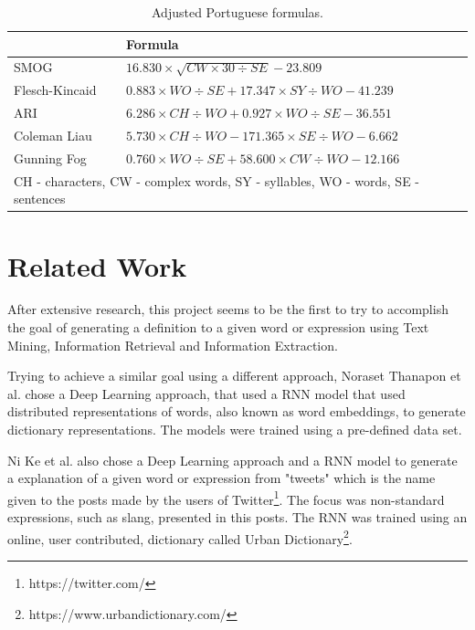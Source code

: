\begin{table}[H]
    \centering
    \caption{Adjusted Portuguese formulas.}
    \label{table:ptformulas}
    \begin{tabular}{l|l}
        \hline
        {} & {\bfseries Formula} \\
        \hline
        SMOG & \(16.830 \times \sqrt{CW \times 30 \div SE} - 23.809\)  \\
        \hline
        Flesch-Kincaid & \(0.883 \times WO \div SE + 17.347 \times SY \div WO - 41.239\) \\
        \hline
        ARI & \(6.286 \times CH \div WO + 0.927 \times WO \div SE - 36.551\) \\
        \hline
        Coleman Liau & \(5.730 \times CH \div WO - 171.365 \times SE \div WO - 6.662\) \\
        \hline
        Gunning Fog & \(0.760 \times WO \div SE + 58.600 \times CW \div WO - 12.166\) \\
        \hline
        \multicolumn{2}{l}{CH - characters, CW - complex words, SY - syllables, WO - words, SE - sentences}
    \end{tabular}
\end{table}

\section{Related Work}

After extensive research, this project seems to be the first to try to accomplish the goal of generating a definition to a given word or expression using Text Mining, Information Retrieval and Information Extraction.

Trying to achieve a similar goal using a different approach, Noraset Thanapon et al.\cite{noraset2016definition} chose a Deep Learning approach, that used a \gls{RNN} model that used distributed representations of words, also known as word embeddings, to generate dictionary representations.
The models were trained using a pre-defined data set.

Ni Ke et al.\cite{ni2017learning} also chose a Deep Learning approach and a \gls{RNN} model to generate a explanation of a given word or expression from "tweets" which is the name given to the posts made by the users of Twitter\footnote{https://twitter.com/}.
The focus was non-standard expressions, such as slang, presented in this posts.
The \gls{RNN} was trained using an online, user contributed, dictionary called Urban Dictionary\footnote{https://www.urbandictionary.com/}.

